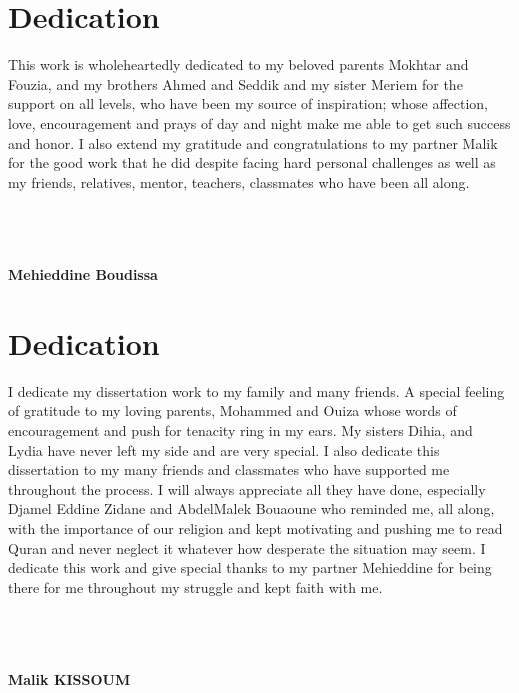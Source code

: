 \chapter*{\centering Dedication}
This work is wholeheartedly dedicated to my beloved parents Mokhtar and Fouzia, and my brothers Ahmed and Seddik and my sister Meriem for the support on all levels, who have been my source of inspiration; whose affection, love, encouragement and prays of day and night make me able to get such success and honor. I also extend my gratitude and congratulations to my partner Malik for the good work that he did despite facing hard personal challenges as well as my friends, relatives, mentor, teachers, classmates who have been all along.
\\
\\
\\
\\
\begin{Large}
  \textbf{Mehieddine Boudissa}
\end{Large}

\chapter*{\centering Dedication}
I dedicate my dissertation work to my family and many friends. A special
feeling of gratitude to my loving parents, Mohammed and Ouiza  whose
words of encouragement and push for tenacity ring in my ears. My sisters Dihia,
and Lydia have never left my side and are very special.
 I also dedicate this dissertation to my many friends and classmates who have
supported me throughout the process. I will always appreciate all they have done,
especially Djamel Eddine Zidane and AbdelMalek Bouaoune who reminded me, all along, with the importance of our religion and kept motivating
and pushing me to read Quran and never neglect it whatever how desperate the situation may seem.
I dedicate this work and give special thanks to my partner Mehieddine for being there for me throughout my struggle and kept faith with me.
\\
\\
\\
\\
\begin{Large}
  \textbf{Malik KISSOUM}
\end{Large}

